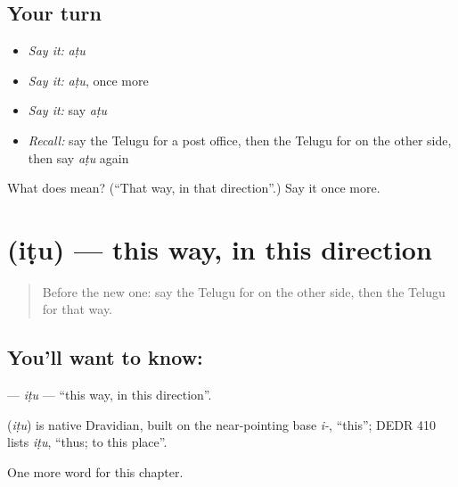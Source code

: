 \subsection*{Your turn}
\begin{itemize}
\raggedright
  \item \emph{Say it:} \emph{aṭu}
  \item \emph{Say it:} \emph{aṭu}, once more
  \item \emph{Say it:} say \emph{aṭu}
  \item \emph{Recall:} say the Telugu for a post office, then the Telugu for on the other side, then say \emph{aṭu} again
\end{itemize}

\begin{tcolorbox}[breakable,colback=teal!4,colframe=teal!35!black,title={Before you move on}]
What does  mean? (\textquotedblleft{}That way, in that direction\textquotedblright{}.) Say it once more.
\end{tcolorbox}
\section[\texorpdfstring{\te{ఇటు} (iṭu)}{ఇటు (iṭu)}]{ (iṭu) — this way, in this direction}

\label{lesson:TE-C174-itu}



\begin{quote}
Before the new one: say the Telugu for on the other side, then the Telugu for that way.
\end{quote}

\subsection*{You'll want to know: }
\textbf{} — \emph{iṭu} — \textquotedblleft{}this way, in this direction\textquotedblright{}.

\begin{cousinweb}
\textbf{} (\emph{iṭu}) is native Dravidian, built on the near-pointing base \emph{i-}, \textquotedblleft{}this\textquotedblright{}; DEDR 410 lists \emph{iṭu}, \textquotedblleft{}thus; to this place\textquotedblright{}.
\end{cousinweb}

\begin{grammarlens}[title={What you've built}]
One more word for this chapter.
\end{grammarlens}

